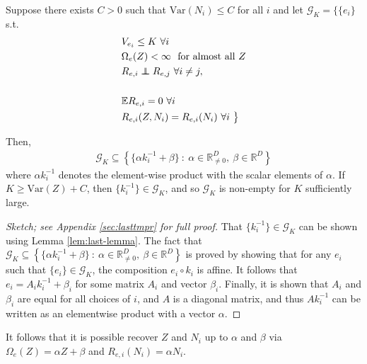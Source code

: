 \medskip

\begin{theorem}
	\label{thm:lastthm}
	Suppose there exists $C>0$ such that $\text{Var}(N_i) \leq C$ for all $i$ and let $\mathcal{G}_K = \big\lbrace
	\{{e}_i \}$ s.t.
	\begin{align}
	& V_{{e}_i} \leq K \ \forall i \label{eq:resid_1}\\
	& \Omega_{{e}}(Z) < \infty \  \text{ for almost all } Z \label{eq:resid_2}\\
	&R_{{e}, i} \independent R_{{e}, j} \ \forall i \not= j, \label{eq:resid_3}\\
	\nonumber \\    &\mathbb{E} R_{{e}, i} = 0 \ \forall i \label{eq:resid_5} \\
	&R_{{e}, i}(Z, N_i) = R_{{e}, i}(N_i) \ \forall i \ \big\rbrace \label{eq:resid_6}
	\end{align}
	
	Then,
	\begin{align*}
	\mathcal{G}_K \subseteq\left\lbrace \{ {\alpha} {k}^{-1}_i + {\beta} \} \ : \ {\alpha} \in \mathbb{R}^{D}_{\not=0}, \: {\beta} \in \mathbb{R}^{D} \right\rbrace
	\end{align*}
	where $\alpha {k}^{-1}_i$ denotes the element-wise product with the scalar elements of ${\alpha}$.
	If $K \geq \text{Var}(Z) + C$, then $ \{ {k}^{-1}_i \}  \in \mathcal{G}_K$,
	and so $\mathcal{G}_K$ is non-empty for $K$ sufficiently large.
\end{theorem}
\begin{proof}[Sketch; see Appendix \ref{sec:lasttmpr} for full proof]
That $\{ {k}^{-1}_i \}  \in \mathcal{G}_K$ can be shown using Lemma \ref{lem:last-lemma}. 
The fact that $\mathcal{G}_K \subseteq\left\lbrace \{ {\alpha} {k}^{-1}_i + {\beta} \} \ : \ {\alpha} \in \mathbb{R}^{D}_{\not=0}, \: {\beta} \in \mathbb{R}^{D} \right\rbrace$ is proved by showing that for any $e_i$ such that $\{e_i\} \in \mathcal{G}_K$, the composition $e_i \circ k_i$ is affine.
It follows that $e_i = A_i k_i^{-1} + \beta_i$ for some matrix $A_i$ and vector $\beta_i$. 
Finally, it is shown that $A_i$ and $\beta_i$ are equal for all choices of $i$, and $A$ is a diagonal matrix, and thus $A k_i^{-1}$ can be written as an elementwise product with a vector $\alpha$.
\end{proof}

It follows that it is possible recover $Z$ and $N_i$ up to ${\alpha}$ and ${\beta}$ via $\Omega_e(Z) = {\alpha}Z + {\beta}$ and $R_{{e}, i}(N_i) = {\alpha}N_i$.

